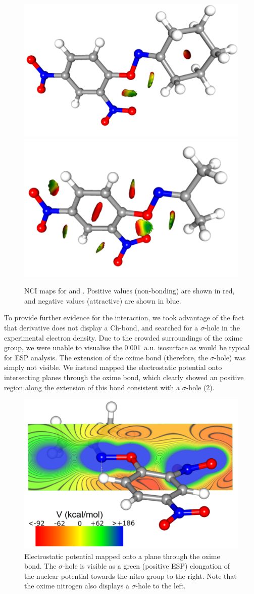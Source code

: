 \begin{refsection}
\begin{figure}
	\centering
	\includegraphics[angle=90,width=0.35\columnwidth]{Figures/cyclohexanone-oxime-dnp-nci.pdf}
	\includegraphics[angle=90,width=0.35\columnwidth]{Figures/acetone-oxime-dnp-nci.pdf}
	\caption[NCI maps for  and .]{NCI maps for  and . Positive values (non-bonding) are shown in red, and negative values (attractive) are shown in blue.}
	\label{fig:NCI}
\end{figure}

To provide further evidence for the interaction, we took advantage of the fact that derivative  does not display a Ch-bond, and searched for a $\sigma$-hole in the experimental electron density.
Due to the crowded surroundings of the oxime group, we were unable to visualise the 0.001~a.u. isosurface as would be typical for ESP analysis.
The extension of the oxime bond (therefore, the $\sigma$-hole) was simply not visible.
We instead mapped the electrostatic potential onto intersecting planes through the oxime bond, which clearly showed an positive region along the extension of this bond consistent with a $\sigma$-hole (\cref{fig:acetone-esp}).

\begin{figure}
	\centering
	\includegraphics[width=0.6\columnwidth]{Figures/acetone-oxime-dnp-esp.pdf}
	\caption[Electrostatic potential mapped onto a plane through the oxime bond.]{Electrostatic potential mapped onto a plane through the oxime bond. The $\sigma$-hole is visible as a green (positive ESP) elongation of the nuclear potential towards the nitro group to the right. Note that the oxime nitrogen also displays a $\sigma$-hole to the left.}
	\label{fig:acetone-esp}
\end{figure}


\end{refsection}
